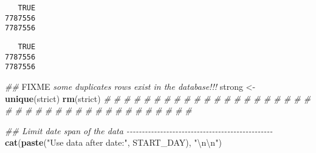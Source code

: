 \documentclass[
  10pt,
  a4paper,oneside]{article}
\newenvironment{Shaded}{\begin{snugshade}}{\end{snugshade}}
\newcommand{\AlertTok}[1]{\textcolor[rgb]{0.94,0.16,0.16}{#1}}
\newcommand{\CharTok}[1]{\textcolor[rgb]{0.31,0.60,0.02}{#1}}
\newcommand{\CommentTok}[1]{\textcolor[rgb]{0.56,0.35,0.01}{\textit{#1}}}
\newcommand{\DecValTok}[1]{\textcolor[rgb]{0.00,0.00,0.81}{#1}}
\newcommand{\KeywordTok}[1]{\textcolor[rgb]{0.13,0.29,0.53}{\textbf{#1}}}
\newcommand{\NormalTok}[1]{#1}
\newcommand{\OperatorTok}[1]{\textcolor[rgb]{0.81,0.36,0.00}{\textbf{#1}}}
\newcommand{\OtherTok}[1]{\textcolor[rgb]{0.56,0.35,0.01}{#1}}
\newcommand{\StringTok}[1]{\textcolor[rgb]{0.31,0.60,0.02}{#1}}
\begin{document}
\begin{Shaded}
\end{Shaded}

\begin{verbatim}
   TRUE 
7787556 
7787556
\end{verbatim}

\begin{Shaded}
\end{Shaded}

\begin{verbatim}
   TRUE 
7787556 
7787556
\end{verbatim}

\begin{Shaded}
\begin{Highlighting}[]
\CommentTok{\#\# }\AlertTok{FIXME}\CommentTok{ some duplicates rows exist in the database!!!}
\NormalTok{strong \textless{}{-}}\StringTok{ }\KeywordTok{unique}\NormalTok{(strict)}
\KeywordTok{rm}\NormalTok{(strict)}
\CommentTok{\# \# \# \# \# \# \# \# \# \# \# \# \# \# \# \# \# \# \# \# \# \# \# \# \# \# \# \# \# \# \# \# \# \# \# \# \# \# \# \#}



\CommentTok{\#\#  Limit date span of the data {-}{-}{-}{-}{-}{-}{-}{-}{-}{-}{-}{-}{-}{-}{-}{-}{-}{-}{-}{-}{-}{-}{-}{-}{-}{-}{-}{-}{-}{-}{-}{-}{-}{-}{-}{-}{-}{-}{-}{-}{-}{-}{-}{-}{-}{-}{-}{-}}
\KeywordTok{cat}\NormalTok{(}\KeywordTok{paste}\NormalTok{(}\StringTok{"Use data after date:"}\NormalTok{, START\_DAY), }\StringTok{"}\CharTok{\textbackslash{}n\textbackslash{}n}\StringTok{"}\NormalTok{)}
\end{Highlighting}
\end{Shaded}
\end{document}
